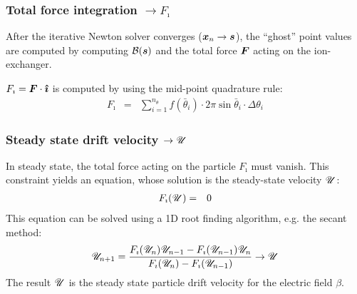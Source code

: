 \subsubsection{Total force integration $\rightarrow F_\imath$}
After the iterative Newton solver converges ($\boldsymbol{x}_n \rightarrow \boldsymbol{s}$), 
the ``ghost'' point values are computed by computing $\mathcal{B}(\boldsymbol{s})$ and
the total force $\boldsymbol{F}$ acting on the ion-exchanger.

$F_\imath = \boldsymbol{F} \cdot \boldsymbol{\hat{\imath}}$ is computed by using the mid-point quadrature rule:
\begin{eqnarray}
F_\imath &=& \sum_{i=1}^{n_\theta} f(\bar\theta_i) \cdot 
              2 \pi \sin\bar\theta_i \cdot \Delta\theta_i
\end{eqnarray}

\subsubsection{Steady state drift velocity $\rightarrow \mathscr{U}$}
In steady state, the total force acting on the particle $F_\imath$ must vanish.
This constraint yields an equation, whose solution is the steady-state velocity $\mathscr{U}$:
\begin{eqnarray}
F_\imath(\mathscr{U}) &=& 0
\end{eqnarray}
This equation can be solved using a 1D root finding algorithm, e.g. the secant method:
\begin{eqnarray}
\mathscr{U}_{n+1} = \frac{F_\imath(\mathscr{U}_{n})\mathscr{U}_{n-1} - F_\imath(\mathscr{U}_{n-1})\mathscr{U}_{n}}
{F_\imath(\mathscr{U}_{n}) - F_\imath(\mathscr{U}_{n-1})} \rightarrow \mathscr{U}
\end{eqnarray}
The result $\mathscr{U}$ is the 
steady state particle drift velocity for the electric field $\beta$.

